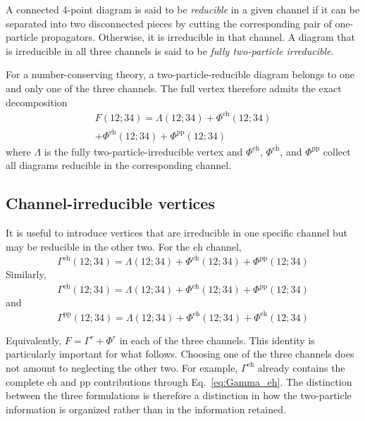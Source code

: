 \documentclass[aip,jcp,reprint,noshowkeys,superscriptaddress]{revtex4-1}
\newcommand{\eh}{\text{eh}}
\newcommand{\teh}{\overline{\text{eh}}}
\newcommand{\pp}{\text{pp}}
\begin{document}
A connected 4-point diagram is said to be \emph{reducible} in a given
channel if it can be separated into two disconnected pieces by cutting
the corresponding pair of one-particle propagators.
Otherwise, it is irreducible in that channel.
A diagram that is irreducible in all three channels is said to be
\emph{fully two-particle irreducible}.

For a number-conserving theory, a two-particle-reducible diagram belongs
to one and only one of the three channels.
The full vertex therefore admits the exact decomposition
\begin{multline}
	F(12;34)
	=
	\Lambda(12;34)
	+
	\Phi^\eh(12;34)
	\\
	+
	\Phi^{\teh}(12;34)
	+
	\Phi^\pp(12;34)
	\label{eq:parquet_decomposition}
\end{multline}
where $\Lambda$ is the fully two-particle-irreducible vertex and
$\Phi^\eh$, $\Phi^{\teh}$, and $\Phi^\pp$ collect all
diagrams reducible in the corresponding channel.

\subsection{Channel-irreducible vertices}

It is useful to introduce vertices that are irreducible in one specific
channel but may be reducible in the other two.
For the $\eh$ channel,
\begin{equation}
	\Gamma^\eh(12;34)
	=
	\Lambda(12;34)
	+
	\Phi^{\teh}(12;34)
	+
	\Phi^\pp(12;34)
	\label{eq:Gamma_eh}
\end{equation}
Similarly,
\begin{equation}
	\Gamma^{\teh}(12;34)
	=
	\Lambda(12;34)
	+
	\Phi^\eh(12;34)
	+
	\Phi^\pp(12;34)
	\label{eq:Gamma_ehbar}
\end{equation}
and
\begin{equation}
	\Gamma^\pp(12;34)
	=
	\Lambda(12;34)
	+
	\Phi^\eh(12;34)
	+
	\Phi^{\teh}(12;34)
	\label{eq:Gamma_pp}
\end{equation}

Equivalently, $F=\Gamma^r+\Phi^r$ in each of the three channels.
This identity is particularly important for what follows.
Choosing one of the three channels does not amount to neglecting the
other two.
For example, $\Gamma^\eh$ already contains the complete
$\teh$ and $\pp$ contributions through
Eq.~\eqref{eq:Gamma_eh}.
The distinction between the three formulations is therefore a distinction
in how the two-particle information is organized rather than in the
information retained.
\end{document}

